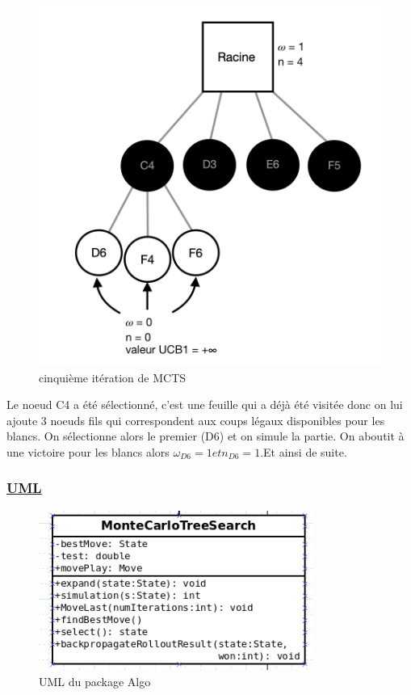 \documentclass[12pt]{article}
\begin{document}
\begin{figure}[h!]
		\centering
		\includegraphics[width = 1\textwidth]{images/exem2.png}
		\caption{cinquième itération de MCTS}
		\label{eq1}
	\end{figure}
\newpage
 Le noeud C4 a été sélectionné, c’est une feuille qui a déjà été visitée donc on lui ajoute 3
noeuds fils qui correspondent aux coups légaux disponibles pour les blancs. On
sélectionne alors le premier (D6) et on simule la partie. On aboutit à une victoire pour les
blancs alors $ \omega_{D6} = 1 et n_{D6} = 1 $.Et ainsi de suite.
\subsubsection{\underline{UML}}
	\begin{figure}[ht!]
		\centering
		\includegraphics[width = 0.8\textwidth]{images/diaAlgo.png}
		\caption{UML du package Algo}
		\label{eq1}
	\end{figure}
\newpage
\end{document}
